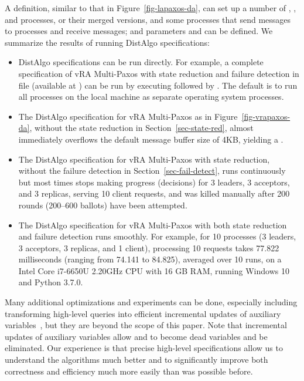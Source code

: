 \documentclass[11pt]{article}
\begin{document}

A  definition, similar to that in Figure~\ref{fig-lapaxos-da}, can
set up a number of , , and  processes,
or their merged versions, and some  processes that send
 messages to  processes and receive 
messages; and parameters  and  can be defined.
We summarize the results of running DistAlgo specifications:
\begin{itemize}

\item DistAlgo specifications can be run directly. For example, a complete
  specification of vRA Multi-Paxos with state reduction and failure
  detection in file  (available at
  \anonymous{}%
  )
  can be run %
  by executing %
   followed by 
  .
  The default is to run all processes on the local machine as separate
  operating system processes.

\item The DistAlgo specification for vRA Multi-Paxos as in
  Figure~\ref{fig-vrapaxos-da}, without the state reduction in
  Section~\ref{sec-state-red}, almost immediately overflows the default
  message buffer size of 4KB, yielding a .

\item The DistAlgo specification for vRA Multi-Paxos with state reduction,
  without the failure detection in Section~\ref{sec-fail-detect}, runs
  continuously but most times stops making progress (decisions) for 3
  leaders, 3 acceptors, and 3 replicas, serving 10 client requests, and was
  killed manually after 200 rounds (200--600 ballots) have been attempted.

\item The DistAlgo specification for vRA Multi-Paxos with both state
  reduction and failure detection runs smoothly.  For example, for %
  10 processes (3 leaders, 3 acceptors, 3 replicas, and 1 client), %
  processing 10 requests takes 77.822 %
  milliseconds (ranging from 74.141 %
  to 84.825), %
  averaged over 10 runs, on a %
  Intel Core i7-6650U 2.20GHz CPU %
  with 16 GB RAM, running Windows 10 and Python 3.7.0. %

\end{itemize}


Many additional optimizations and experiments %
can be done, especially including transforming high-level queries into
efficient 
incremental updates of auxiliary variables~\cite{Liu+12DistPL-OOPSLA,Liu+17DistPL-TOPLAS}, 
but they are beyond the scope of this paper.
Note that incremental updates of auxiliary variables
allow  and  to become dead variables and be eliminated.
Our experience is that precise high-level specifications %
allow us to understand the algorithms much better and to significantly
improve both correctness and efficiency much more easily than was possible
before.
\end{document}
